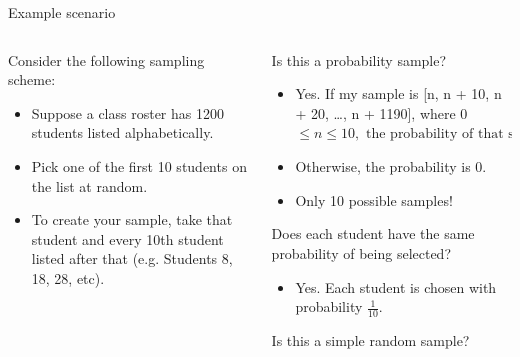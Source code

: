 \documentclass[aspectratio=169]{../latex_main/tntbeamer}  %
\begin{document}
	\begin{frame}{Example scenario}
	    \begin{columns}
	        \begin{column}{.3\textwidth}
	            Consider the following sampling scheme:

	            \begin{itemize}
	                \item Suppose a class roster has 1200 students listed alphabetically.
	                \item Pick one of the first 10 students on the list at random.
	                \item To create your sample, take that student and every 10th student listed after that (e.g. Students 8, 18, 28, etc).
	            \end{itemize}

                 
	        \end{column}
	        
	        \begin{column}{.6\textwidth}
	           Is this a probability sample?
	           \begin{itemize}
	               \item Yes. If my sample is [n, n + 10, n + 20, …, n + 1190], where 0 $\leq n \leq 10, \text{ the probability of that sample is } \frac{1}{10}$
	               \item Otherwise, the probability is 0.
	               \item Only 10 possible samples!
	           \end{itemize}
	           Does each student have the same probability of being selected?
	           \begin{itemize}
	               \item Yes. Each student is chosen with probability $\frac{1}{10}$. 
	           \end{itemize}
	           Is this a simple random sample?


	        \end{column}
	        
	    \end{columns}
	    
	\end{frame}
	
\end{document}
